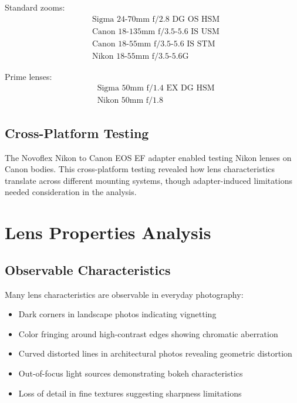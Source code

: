 Standard zooms:
\begin{equation*}
\begin{aligned}
&\text{Sigma 24-70mm f/2.8 DG OS HSM} \\
&\text{Canon 18-135mm f/3.5-5.6 IS USM} \\
&\text{Canon 18-55mm f/3.5-5.6 IS STM} \\
&\text{Nikon 18-55mm f/3.5-5.6G}
\end{aligned}
\end{equation*}

Prime lenses:
\begin{equation*}
\begin{aligned}
&\text{Sigma 50mm f/1.4 EX DG HSM} \\
&\text{Nikon 50mm f/1.8}
\end{aligned}
\end{equation*}

\subsection{Cross-Platform Testing}
The Novoflex Nikon to Canon EOS EF adapter enabled testing Nikon lenses on Canon bodies. This cross-platform testing revealed how lens characteristics translate across different mounting systems, though adapter-induced limitations needed consideration in the analysis.

\section{Lens Properties Analysis}

\subsection{Observable Characteristics}
Many lens characteristics are observable in everyday photography:
\begin{itemize}
    \item Dark corners in landscape photos indicating vignetting
    \item Color fringing around high-contrast edges showing chromatic aberration
    \item Curved distorted lines in architectural photos revealing geometric distortion
    \item Out-of-focus light sources demonstrating bokeh characteristics
    \item Loss of detail in fine textures suggesting sharpness limitations
\end{itemize}

